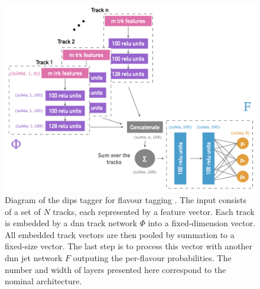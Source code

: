 \begin{figure}[h!]
  \center
  \includegraphics[scale=0.6]{Images/FTAG/dips_structure.png}
  \caption{Diagram of the \gls{dips} tagger for flavour tagging \cite{ATL-PHYS-PUB-2020-014}. The input consists of a set of $N$ tracks, each represented by a feature vector. Each track is embedded by a \gls{dnn} track network $\Phi$ into a fixed-dimension vector. All embedded track vectors are then pooled by summation to a fixed-size vector. The last step is to process this vector with another \gls{dnn} jet network $F$ outputing the per-flavour probabilities. The number and width of layers presented here correspond to the nominal architecture.} 
  \label{fig:dipsModel}
\end{figure}

